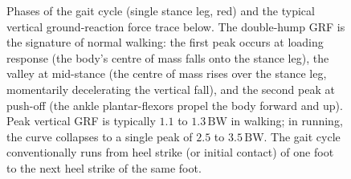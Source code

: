 \begin{figure}[htbp]
\begin{tikzpicture}[
  axis/.style={-{Stealth}, thick, draw=engblack},
  stick/.style={thick, draw=engblack},
  label/.style={font=\scriptsize, align=center},
]
\end{tikzpicture}
\caption{Phases of the gait cycle (single stance leg, red) and the
typical vertical ground-reaction force trace below. The double-hump
GRF is the signature of normal walking: the first peak occurs at
loading response (the body's centre of mass falls onto the stance
leg), the valley at mid-stance (the centre of mass rises over the
stance leg, momentarily decelerating the vertical fall), and the
second peak at push-off (the ankle plantar-flexors propel the body
forward and up). Peak vertical GRF is typically $1.1$ to $1.3\,\text{BW}$
in walking; in running, the curve collapses to a single peak of
$2.5$ to $3.5\,\text{BW}$. The gait cycle conventionally runs from
heel strike (or initial contact) of one foot to the next heel strike
of the same foot.}
\label{fig:vol06ch06:gait-phases}
\end{figure}
